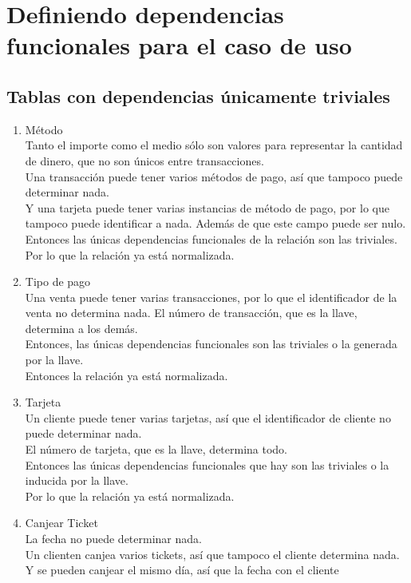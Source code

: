 \documentclass[10pt]{article}
\begin{document}
\section{Definiendo dependencias funcionales para el caso de uso}

\subsection{Tablas con dependencias únicamente triviales}
\begin{enumerate}
	\item Método\\
	Tanto el importe como el medio sólo son valores para representar la cantidad
	de dinero, que no son únicos entre transacciones.\\
	Una transacción puede tener varios métodos de pago, así que tampoco
	puede determinar nada.\\
	Y una tarjeta puede tener varias instancias de método de pago, por lo que
	tampoco puede identificar a nada. Además de que este campo puede ser nulo.\\
	Entonces las únicas dependencias funcionales de la relación son las
	triviales.\\
	Por lo que la relación ya está normalizada.
	\item Tipo de pago \\
	Una venta puede tener varias transacciones, por lo que el identificador de
	la venta no determina nada. El número de transacción, que es la llave, 
	determina a los demás.\\
	Entonces, las únicas dependencias funcionales son las triviales o la
	generada por la llave.\\
	Entonces la relación ya está normalizada.
	\item Tarjeta \\
	Un cliente puede tener varias tarjetas, así que el identificador de cliente 
	no puede determinar nada. \\
	El número de tarjeta, que es la llave, determina todo. \\
	Entonces las únicas dependencias funcionales que hay son las triviales o la
	inducida por la llave.\\
	Por lo que la relación ya está normalizada.
	\item Canjear Ticket \\
	La fecha no puede determinar nada. \\ 
	Un clienten canjea varios tickets, así que tampoco el cliente determina
	nada. Y se pueden canjear el mismo día, así que la fecha con el cliente

\end{enumerate}
\end{document}
